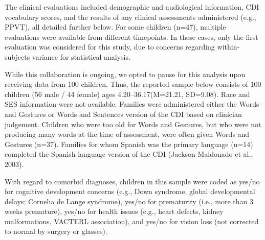 \documentclass[english,man]{apa6}
\begin{document}
The clinical evaluations included demographic and audiological information, CDI vocabulary scores, and the results of any clinical assessments administered (e.g., PPVT), all detailed further below. For some children (n=47), multiple evaluations were available from different timepoints. In these cases, only the first evaluation was considered for this study, due to concerns regarding within-subjects variance for statistical analysis.

While this collaboration is ongoing, we opted to pause for this analysis upon receiving data from 100 children. Thus, the reported sample below consists of 100 children (56 male / 44 female) ages 4.20--36.17(M=21.21, SD=9.08). Race and SES information were not available. Families were administered either the Words and Gestures or Words and Sentences version of the CDI based on clinician judgement. Children who were too old for Words and Gestures, but who were not producing many words at the time of assessment, were often given Words and Gestures (n=37). Families for whom Spanish was the primary language (n=14) completed the Spanish language version of the CDI (Jackson-Maldonado et al., 2003).

\begin{table}

\caption{\label{tab:CDIinfo}CDI details}
\centering
{}
\end{table}

With regard to comorbid diagnoses, children in this sample were coded as yes/no for cognitive development concerns (e.g., Down syndrome, global developmental delays; Cornelia de Lange syndrome), yes/no for prematurity (i.e., more than 3 weeks premature), yes/no for health issues (e.g., heart defects, kidney malformations, VACTERL association), and yes/no for vision loss (not corrected to normal by surgery or glasses).
\end{document}
